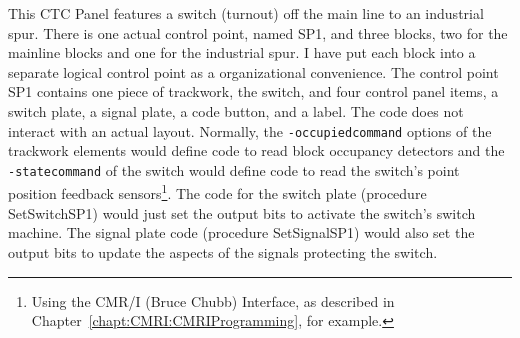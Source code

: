 This CTC Panel features a switch (turnout) off the main line to an
industrial spur. There is one actual control point, named SP1, and
three blocks, two for the mainline blocks and one for the industrial
spur.  I have put each block into a separate logical control point as a
organizational  convenience.  The control point SP1 contains one piece
of trackwork, the switch, and four control panel items, a switch plate,
a signal plate, a code button, and a label.  The code does not interact
with an actual layout.  Normally, the \lstinline=-occupiedcommand= 
options of the trackwork elements would define code to read block
occupancy detectors and the \lstinline=-statecommand= of the switch
would define code to read the switch's point position feedback
sensors\footnote{Using the  CMR/I (Bruce Chubb) Interface, as described
in Chapter~\ref{chapt:CMRI:CMRIProgramming}, for example.}. The code
for the switch plate (procedure SetSwitchSP1) would just set the output
bits to activate the switch's switch machine.  The signal plate code
(procedure SetSignalSP1) would also set the output bits to update the
aspects of the signals protecting the switch.

